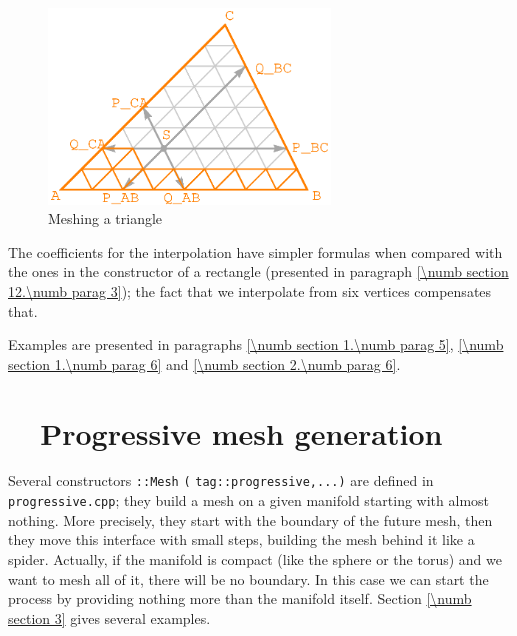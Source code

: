 \begin{figure}[ht] \centering
  \includegraphics[width=75mm]{fig-triangle}
  \caption{Meshing a triangle}
  \label{\numb section 12.\numb fig 2}
\end{figure}

The coefficients for the interpolation have simpler formulas when compared with the ones in the
constructor of a rectangle (presented in paragraph \ref{\numb section 12.\numb parag 3});
the fact that we interpolate from six vertices compensates that.

Examples are presented in paragraphs \ref{\numb section 1.\numb parag 5},
\ref{\numb section 1.\numb parag 6} and \ref{\numb section 2.\numb parag 6}.


\section{~~Progressive mesh generation}\label{\numb section 12.\numb parag 5}

Several constructors {\small\tt {}::Mesh} {\small\tt(}
{\small\tt\textcolor{tag}{tag}::progressive,...)} are defined in {\small\tt progressive.cpp};
they build a mesh on a given manifold starting with almost nothing.
More precisely, they start with the boundary of the future mesh, then they
move this interface with small steps, building the mesh behind it like a spider.
Actually, if the manifold is compact (like the sphere or the torus) and we want to mesh
all of it, there will be no boundary.
In this case we can start the process by providing nothing more than the manifold itself.
Section \ref{\numb section 3} gives several examples.

